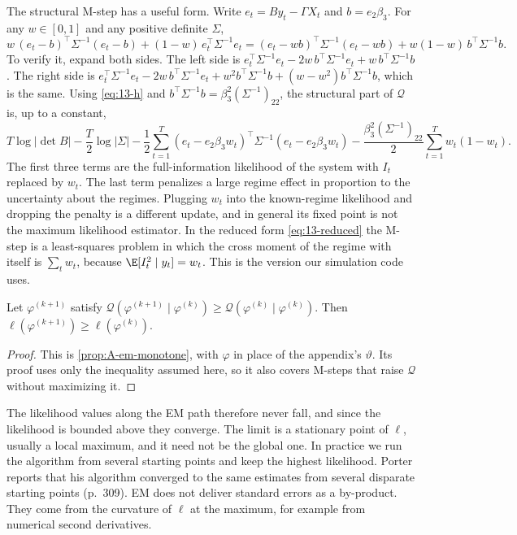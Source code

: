 The structural M-step has a useful form. Write $e_t = By_t - \Gamma X_t$ and $b = e_2\beta_3$. For any $w \in [0,1]$
and any positive definite $\Sigma$,
\begin{equation}\label{eq:13-mstep-identity}
  w\,(e_t - b)^\top\Sigma^{-1}(e_t - b) + (1-w)\,e_t^\top\Sigma^{-1}e_t
  = (e_t - w b)^\top\Sigma^{-1}(e_t - w b) + w(1 - w)\, b^\top\Sigma^{-1}b .
\end{equation}
To verify it, expand both sides. The left side is $e_t^\top\Sigma^{-1}e_t - 2w\,b^\top\Sigma^{-1}e_t +
w\,b^\top\Sigma^{-1}b$. The right side is $e_t^\top\Sigma^{-1}e_t - 2w\,b^\top\Sigma^{-1}e_t +
w^2 b^\top\Sigma^{-1}b + (w - w^2) b^\top\Sigma^{-1}b$, which is the same. Using \eqref{eq:13-h} and
$b^\top\Sigma^{-1}b = \beta_3^2(\Sigma^{-1})_{22}$, the structural part of $\mathcal{Q}$ is, up to a constant,
\begin{equation}\label{eq:13-mstep-structural}
  T\log|\det B| - \frac{T}{2}\log|\Sigma| - \frac{1}{2}\sum_{t=1}^T (e_t - e_2\beta_3 w_t)^\top\Sigma^{-1}
  (e_t - e_2\beta_3 w_t) - \frac{\beta_3^2(\Sigma^{-1})_{22}}{2}\sum_{t=1}^T w_t(1 - w_t) .
\end{equation}
The first three terms are the full-information likelihood of the system with $I_t$ replaced by $w_t$. The last
term penalizes a large regime effect in proportion to the uncertainty about the regimes. Plugging $w_t$ into the
known-regime likelihood and dropping the penalty is a different update, and in general its fixed point is not the
maximum likelihood estimator. In
the reduced form \eqref{eq:13-reduced} the M-step is a least-squares problem in which the cross moment of the regime
with itself is $\sum_t w_t$, because $\E[I_t^2 \mid y_t] = w_t$. This is the version our simulation code uses.

\begin{theorem}\label{thm:13-em-ascent}
Let $\varphi^{(k+1)}$ satisfy $\mathcal{Q}(\varphi^{(k+1)}\mid\varphi^{(k)}) \ge
\mathcal{Q}(\varphi^{(k)}\mid\varphi^{(k)})$. Then $\ell(\varphi^{(k+1)}) \ge \ell(\varphi^{(k)})$.
\end{theorem}

\begin{proof}
This is \cref{prop:A-em-monotone}, with $\varphi$ in place of the appendix's $\vartheta$. Its proof uses only the
inequality assumed here, so it also covers M-steps that raise $\mathcal{Q}$ without maximizing it.
\end{proof}

The likelihood values along the EM path therefore never fall, and since the likelihood is bounded above they
converge. The limit is a stationary point of $\ell$, usually a local maximum, and it need not be the global one. In
practice we run the algorithm from several starting points and keep the highest likelihood. Porter reports that his
algorithm converged to the same estimates from several disparate starting points (p.~309). EM does not deliver
standard errors as a by-product. They come from the curvature of $\ell$ at the maximum, for example from numerical
second derivatives.

